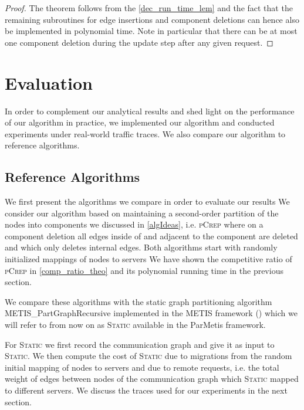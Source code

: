 \documentclass[a4paper,UKenglish,cleveref, autoref, thm-restate,authorcolumns]{lipics-v2019}
\newcommand{\adjDel}{\textsc{pCrep}}
\newcommand{\static}{\textsc{Static}}
\newcommand{\coreDel}{\text{C{\scriptsize REP}-C{\scriptsize ORE}}}
\begin{document}
\begin{proof}
	The theorem follows from the \cref{dec_run_time_lem} and the fact that the remaining subroutines for edge insertions and component deletions can hence also be implemented in polynomial time. Note in particular that there can be at most one component deletion during the update step after any given request.
\end{proof}


\section{Evaluation}
\label{sec:evaluation}

In order to complement our analytical results and shed light
on the performance of our algorithm in practice, 
we implemented our algorithm and conducted experiments
under real-world traffic traces. 
We also compare our algorithm to reference algorithms.

\subsection{Reference Algorithms}
\label{algSection}

We first present the algorithms we compare in order to evaluate our results
We consider our algorithm based on maintaining a second-order partition of the nodes into components we discussed in \cref{algIdeas}, 
i.e. \adjDel{} where on a component deletion all edges inside of and adjacent to the component are deleted and \coreDel{} which only deletes internal edges. 
Both algorithms start with randomly initialized mappings of nodes to servers
We have shown the competitive ratio of \adjDel{} in \cref{comp_ratio_theo} and its polynomial running time in the previous section.

We compare these algorithms with the static graph partitioning algorithm METIS\_PartGraphRecursive implemented in the METIS framework (\cite{Karypis1998, Karypis1998a}) which we will refer to from now on as \static{} available in the ParMetis framework. %

For \static{} we first record the communication graph and give it as input to \static{}. We then compute the cost of \static{} due to migrations from the random initial mapping of nodes to servers and due to remote requests, i.e. the total weight of edges between nodes of the communication graph which \static{} mapped to different servers.
We discuss the traces used for our experiments in the next section.
\end{document}
